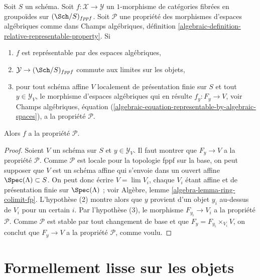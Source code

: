 \begin{lemma}
\label{lemma-check-property-limit-preserving}
Soit $S$ un schéma. Soit $f : \mathcal{X} \to \mathcal{Y}$ un $1$-morphisme
de catégories fibrées en groupoïdes sur $(\Sch/S)_{fppf}$. Soit $\mathcal{P}$
une propriété des morphismes d'espaces algébriques comme dans
Champs algébriques, définition
\ref{algebraic-definition-relative-representable-property}. Si
\begin{enumerate}
\item $f$ est représentable par des espaces algébriques,
\item $\mathcal{Y} \to (\Sch/S)_{fppf}$ commute aux limites sur les objets,
\item pour tout schéma affine $V$ localement de présentation finie sur $S$ et
tout $y \in \mathcal{Y}_V$, le morphisme d'espaces algébriques qui en résulte
$f_y : F_y \to V$, voir Champs algébriques, équation
(\ref{algebraic-equation-representable-by-algebraic-spaces}),
a la propriété $\mathcal{P}$.
\end{enumerate}
Alors $f$ a la propriété $\mathcal{P}$.
\end{lemma}

\begin{proof}
Soient $V$ un schéma sur $S$ et $y \in \mathcal{Y}_V$. Il faut montrer
que $F_y \to V$ a la propriété $\mathcal{P}$. Comme $\mathcal{P}$ est
locale pour la topologie fppf sur la base, on peut supposer que $V$ est un schéma affine qui
s'envoie dans un ouvert affine $\Spec(\Lambda) \subset S$. On peut donc écrire
$V = \lim V_i$, chaque $V_i$ étant affine et de présentation finie sur
$\Spec(\Lambda)$ ; voir Algèbre, lemme \ref{algebra-lemma-ring-colimit-fp}.
L'hypothèse (2) montre alors que $y$ provient d'un objet $y_i$ au-dessus de $V_i$ pour un certain $i$.
Par l'hypothèse (3), le morphisme $F_{y_i} \to V_i$ a la propriété $\mathcal{P}$.
Comme $\mathcal{P}$ est stable par tout changement de base et que
$F_y = F_{y_i} \times_{V_i} V$, on conclut que $F_y \to V$ a la propriété
$\mathcal{P}$, comme voulu.
\end{proof}



\section{Formellement lisse sur les objets}
\label{section-formally-smooth}

